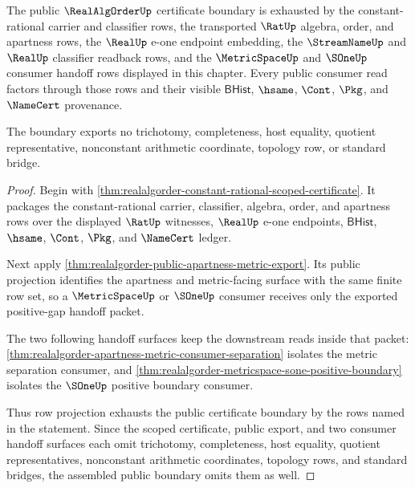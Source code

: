 \begin{theorem}
\label{thm:realalgorder-public-certificate-audit-boundary}
The public $\RealAlgOrderUp$ certificate boundary is exhausted by the
constant-rational carrier and classifier rows, the transported $\RatUp$
algebra, order, and apartness rows, the $\RealUp$ e-one endpoint embedding, the
$\StreamNameUp$ and $\RealUp$ classifier readback rows, and the
$\MetricSpaceUp$ and $\SOneUp$ consumer handoff rows displayed in this chapter.
Every public consumer read factors through those rows and their visible
$\mathsf{BHist}$, $\hsame$, $\Cont$, $\Pkg$, and $\NameCert$ provenance.

The boundary exports no trichotomy, completeness, host equality, quotient
representative, nonconstant arithmetic coordinate, topology row, or standard
bridge.
\end{theorem}
\begin{proof}
Begin with
\autoref{thm:realalgorder-constant-rational-scoped-certificate}. It packages the
constant-rational carrier, classifier, algebra, order, and apartness rows over
the displayed $\RatUp$ witnesses, $\RealUp$ e-one endpoints, $\mathsf{BHist}$,
$\hsame$, $\Cont$, $\Pkg$, and $\NameCert$ ledger.

Next apply \autoref{thm:realalgorder-public-apartness-metric-export}. Its
public projection identifies the apartness and metric-facing surface with the
same finite row set, so a $\MetricSpaceUp$ or $\SOneUp$ consumer receives only
the exported positive-gap handoff packet.

The two following handoff surfaces keep the downstream reads inside that packet:
\autoref{thm:realalgorder-apartness-metric-consumer-separation}
isolates the metric separation consumer, and
\autoref{thm:realalgorder-metricspace-sone-positive-boundary} isolates the
$\SOneUp$ positive boundary consumer.

Thus row projection exhausts the public certificate boundary by the rows named
in the statement. Since the scoped certificate, public export, and two consumer
handoff surfaces each omit trichotomy, completeness, host equality, quotient
representatives, nonconstant arithmetic coordinates, topology rows, and standard
bridges, the assembled public boundary omits them as well.
\end{proof}



